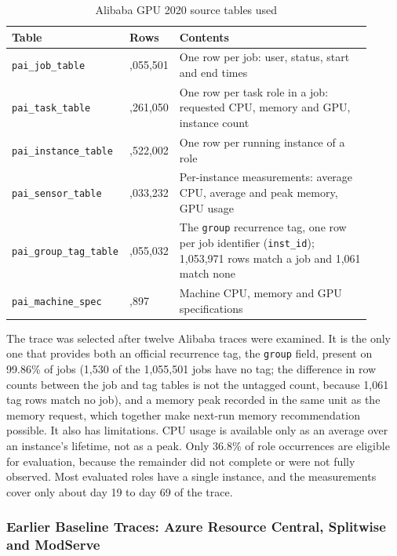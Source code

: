 \begin{table}[!t]
\centering
\footnotesize
\caption{Alibaba GPU 2020 source tables used}\label{tab:3.2}
\begin{tabular}{>{\raggedright\arraybackslash}p{0.206\linewidth}>{\raggedright\arraybackslash}p{0.077\linewidth}>{\raggedright\arraybackslash}p{0.627\linewidth}}
\hline
\textbf{Table} & \textbf{Rows} & \textbf{Contents} \\ \hline
\texttt{pai\_job\_table} & 1,055,501 & One row per job: user, status, start and end times \\
\texttt{pai\_task\_table} & 1,261,050 & One row per task role in a job: requested CPU, memory and GPU, instance count \\
\texttt{pai\_instance\_table} & 7,522,002 & One row per running instance of a role \\
\texttt{pai\_sensor\_table} & 3,033,232 & Per-instance measurements: average CPU, average and peak memory, GPU usage \\
\texttt{pai\_group\_tag\_table} & 1,055,032 & The \texttt{group} recurrence tag, one row per job identifier (\texttt{inst\_id}); 1,053,971 rows match a job and 1,061 match none \\
\texttt{pai\_machine\_spec} & 1,897 & Machine CPU, memory and GPU specifications \\
\hline
\end{tabular}
\end{table}

The trace was selected after twelve Alibaba traces were examined. It is the only one that provides both an official recurrence tag, the \texttt{group} field, present on 99.86\% of jobs (1,530 of the 1,055,501 jobs have no tag; the difference in row counts between the job and tag tables is not the untagged count, because 1,061 tag rows match no job), and a memory peak recorded in the same unit as the memory request, which together make next-run memory recommendation possible. It also has limitations. CPU usage is available only as an average over an instance's lifetime, not as a peak. Only 36.8\% of role occurrences are eligible for evaluation, because the remainder did not complete or were not fully observed. Most evaluated roles have a single instance, and the measurements cover only about day 19 to day 69 of the trace.

\subsubsection{Earlier Baseline Traces: Azure Resource Central, Splitwise and ModServe}\label{sec:3.3.3}

